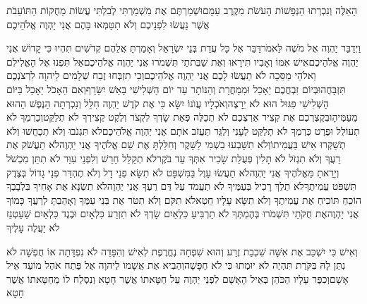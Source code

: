 \documentclass[../main/main.tex]{subfiles}
\begin{document}
\begin{multicols*}{\ncols}
הָאֵלֶּה וְנִכְרְתוּ הַנְּפָשׁוֹת הָעֹשֹׂת מִקֶּרֶב עַמָּם\PreVerseSpace{}וּשְׁמַרְתֶּם אֶת מִשְׁמַרְתִּי לְבִלְתִּי עֲשׂוֹת מֵחֻקּוֹת הַתּוֹעֵבֹת אֲשֶׁר נַעֲשׂוּ לִפְנֵיכֶם וְלֹא תִטַּמְּאוּ בָּהֶם אֲנִי יַהְוֶה אֱלֹהֵיכֶם\OpenSection{}\par
{}וַיְדַבֵּר יַהְוֶה אֶל מֹשֶׁה לֵּאמֹר\PreVerseSpace{}דַּבֵּר אֶל כָּל עֲדַת בְּנֵי יִשְׂרָאֵל וְאָמַרְתָּ אֲלֵהֶם קְדֹשִׁים תִּהְיוּ כִּי קָדוֹשׁ אֲנִי יַהְוֶה אֱלֹהֵיכֶם\PreVerseSpace{}אִישׁ אִמּוֹ וְאָבִיו תִּירָאוּ וְאֶת שַׁבְּתֹתַי תִּשְׁמֹרוּ אֲנִי יַהְוֶה אֱלֹהֵיכֶם\PreVerseSpace{}אַל תִּפְנוּ אֶל הָאֱלִילִם וֵאלֹהֵי מַסֵּכָה לֹא תַעֲשׂוּ לָכֶם אֲנִי יַהְוֶה אֱלֹהֵיכֶם\PreVerseSpace{}וְכִי תִזְבְּחוּ זֶבַח שְׁלָמִים לַיהוָה לִרְצֹנְכֶם תִּזְבָּחֻהוּ\PreVerseSpace{}בְּיוֹם זִבְחֲכֶם יֵאָכֵל וּמִמָּחֳרָת וְהַנּוֹתָר עַד יוֹם הַשְּׁלִישִׁי בָּאֵשׁ יִשָּׂרֵף\PreVerseSpace{}וְאִם הֵאָכֹל יֵאָכֵל בַּיּוֹם הַשְּׁלִישִׁי פִּגּוּל הוּא לֹא יֵרָצֶה\PreVerseSpace{}וְאֹכְלָיו עֲוֺנוֹ יִשָּׂא כִּי אֶת קֹדֶשׁ יַהְוֶה חִלֵּל וְנִכְרְתָה הַנֶּפֶשׁ הַהוּא מֵעַמֶּיהָ\PreVerseSpace{}וּבְקֻצְרְכֶם אֶת קְצִיר אַרְצְכֶם לֹא תְכַלֶּה פְּאַת שָׂדְךָ לִקְצֹר וְלֶקֶט קְצִירְךָ לֹא תְלַקֵּט\PreVerseSpace{}וְכַרְמְךָ לֹא תְעוֹלֵל וּפֶרֶט כַּרְמְךָ לֹא תְלַקֵּט לֶעָנִי וְלַגֵּר תַּעֲזֹב אֹתָם אֲנִי יַהְוֶה אֱלֹהֵיכֶם\PreVerseSpace{}לֹא תִּגְנֹבוּ וְלֹא תְכַחֲשׁוּ וְלֹא תְשַׁקְּרוּ אִישׁ בַּעֲמִיתוֹ\PreVerseSpace{}וְלֹא תִשָּׁבְעוּ בִשְׁמִי לַשָּׁקֶר וְחִלַּלְתָּ אֶת שֵׁם אֱלֹהֶיךָ אֲנִי יַהְוֶה\PreVerseSpace{}לֹא תַעֲשֹׁק אֶת רֵעֲךָ וְלֹא תִגְזֹל לֹא תָלִין פְּעֻלַּת שָׂכִיר אִתְּךָ עַד בֹּקֶר\PreVerseSpace{}לֹא תְקַלֵּל חֵרֵשׁ וְלִפְנֵי עִוֵּר לֹא תִתֵּן מִכְשֹׁל וְיָרֵאתָ מֵּאֱלֹהֶיךָ אֲנִי יַהְוֶה\PreVerseSpace{}לֹא תַעֲשׂוּ עָוֶל בַּמִּשְׁפָּט לֹא תִשָּׂא פְנֵי דָל וְלֹא תֶהְדַּר פְּנֵי גָדוֹל בְּצֶדֶק תִּשְׁפֹּט עֲמִיתֶךָ\PreVerseSpace{}לֹא תֵלֵךְ רָכִיל בְּעַמֶּיךָ לֹא תַעֲמֹד עַל דַּם רֵעֶךָ אֲנִי יַהְוֶה\PreVerseSpace{}לֹא תִשְׂנָא אֶת אָחִיךָ בִּלְבָבֶךָ הוֹכֵחַ תּוֹכִיחַ אֶת עֲמִיתֶךָ וְלֹא תִשָּׂא עָלָיו חֵטְא\PreVerseSpace{}לֹא תִקֹּם וְלֹא תִטֹּר אֶת בְּנֵי עַמֶּךָ וְאָהַבְתָּ לְרֵעֲךָ כָּמוֹךָ אֲנִי יַהְוֶה\PreVerseSpace{}אֶת חֻקֹּתַי תִּשְׁמֹרוּ בְּהֶמְתְּךָ לֹא תַרְבִּיעַ כִּלְאַיִם שָׂדְךָ לֹא תִזְרַע כִּלְאָיִם וּבֶגֶד כִּלְאַיִם שַׁעַטְנֵז לֹא יַעֲלֶה עָלֶיךָ\OpenSection{}\par
{}וְאִישׁ כִּי יִשְׁכַּב אֶת אִשָּׁה שִׁכְבַת זֶרַע וְהוּא שִׁפְחָה נֶחֱרֶפֶת לְאִישׁ וְהִפָּדֵה\SubEnd{} לֹא נִפְדָּתָה אוֹ חֻפְשָׁה לֹא נִתַּן לָהּ בִּקֹּרֶת תִּהְיֶה לֹא יוּמְתוּ כִּי לֹא חֻפָּשָׁה\PreVerseSpace{}וְהֵבִיא אֶת אֲשָׁמוֹ לַיהוָה אֶל פֶּתַח אֹהֶל מוֹעֵד אֵיל אָשָׁם\PreVerseSpace{}וְכִפֶּר עָלָיו הַכֹּהֵן בְּאֵיל הָאָשָׁם לִפְנֵי יַהְוֶה עַל חַטָּאתוֹ אֲשֶׁר חָטָא וְנִסְלַח לוֹ מֵחַטָּאתוֹ אֲשֶׁר חָטָא\OpenSection{}\par

\end{multicols*}
\end{document}
